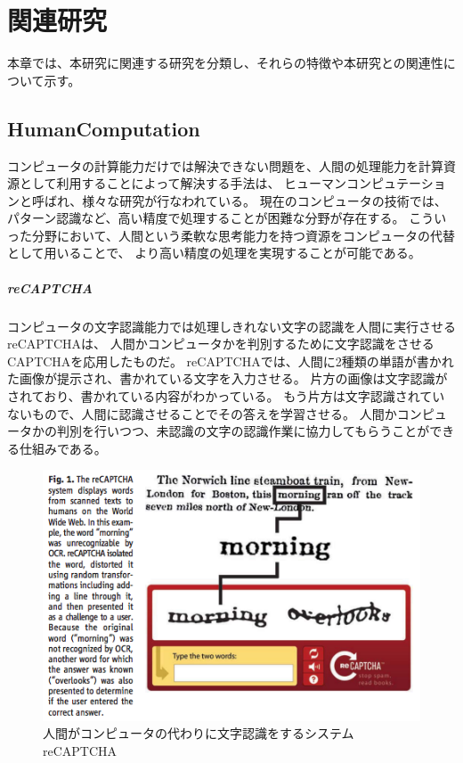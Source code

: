\chapter{関連研究}\label{chap:related}

本章では、本研究に関連する研究を分類し、それらの特徴や本研究との関連性について示す。

\section{HumanComputation}\label{humancomputation}

コンピュータの計算能力だけでは解決できない問題を、人間の処理能力を計算資源として利用することによって解決する手法は、
ヒューマンコンピュテーション\cite{humancomputation}と呼ばれ、様々な研究が行なわれている。
現在のコンピュータの技術では、パターン認識など、高い精度で処理することが困難な分野が存在する。
こういった分野において、人間という柔軟な思考能力を持つ資源をコンピュータの代替として用いることで、
より高い精度の処理を実現することが可能である。

\paragraph{reCAPTCHA}\label{recaptcha}

\mbox{}

コンピュータの文字認識能力では処理しきれない文字の認識を人間に実行させるreCAPTCHA\cite{recaptcha}は、
人間かコンピュータかを判別するために文字認識をさせるCAPTCHA\cite{captcha}を応用したものだ。
reCAPTCHAでは、人間に2種類の単語が書かれた画像が提示され、書かれている文字を入力させる。
片方の画像は文字認識がされており、書かれている内容がわかっている。
もう片方は文字認識されていないもので、人間に認識させることでその答えを学習させる。
人間かコンピュータかの判別を行いつつ、未認識の文字の認識作業に協力してもらうことができる仕組みである。

\begin{figure}[htbp]
  \begin{center}
  \includegraphics[width=.5\linewidth,bb=0 0 476 316]{images/recaptcha.png}
  \end{center}
  \caption{人間がコンピュータの代わりに文字認識をするシステム reCAPTCHA}
  \label{fig:recaptcha}
\end{figure}

